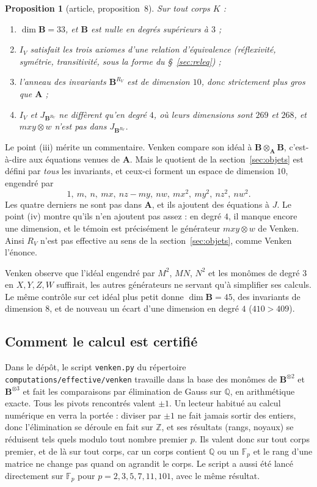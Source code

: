 \documentclass[11pt,a4paper]{amsart}
\theoremstyle{definition}
\theoremstyle{plain}
\newtheorem*{proposition}{Proposition}
\theoremstyle{remark}
\newcommand{\F}{\mathbb F}
\newcommand{\Q}{\mathbb Q}
\newcommand{\Z}{\mathbb Z}
\begin{document}
\begin{proposition}[article, proposition~8]
Sur tout corps $K$ :
\begin{enumerate}
\item $\dim \mathbf B = 33$, et $\mathbf B$ est nulle en degrés supérieurs à $3$ ;
\item $I_V$ satisfait les trois axiomes d'une relation d'équivalence (réflexivité, symétrie, transitivité, sous la forme du §~\ref{sec:releq}) ;
\item l'anneau des invariants $\mathbf B^{R_V}$ est de dimension $10$, donc strictement plus gros que $\mathbf A$ ;
\item $I_V$ et $J_{\mathbf B^{R_V}}$ ne diffèrent qu'en degré $4$, où leurs dimensions sont $269$ et $268$, et $mxy \otimes w$ n'est pas dans $J_{\mathbf B^{R_V}}$.
\end{enumerate}
\end{proposition}

Le point (iii) mérite un commentaire. Venken compare son idéal à $\mathbf B \otimes_{\mathbf A} \mathbf B$, c'est-à-dire aux équations venues de $\mathbf A$. Mais le quotient de la section~\ref{sec:objets} est défini par \emph{tous} les invariants, et ceux-ci forment un espace de dimension $10$, engendré par
\[
1,\ m,\ n,\ mx,\ nz - my,\ nw,\ mx^2,\ my^2,\ nz^2,\ nw^2.
\]
Les quatre derniers ne sont pas dans $\mathbf A$, et ils ajoutent des équations à $J$. Le point (iv) montre qu'ils n'en ajoutent pas assez : en degré $4$, il manque encore une dimension, et le témoin est précisément le générateur $mxy \otimes w$ de Venken. Ainsi $R_V$ n'est pas effective au sens de la section~\ref{sec:objets}, comme Venken l'énonce.

Venken observe que l'idéal engendré par $M^2$, $MN$, $N^2$ et les monômes de degré $3$ en $X, Y, Z, W$ suffirait, les autres générateurs ne servant qu'à simplifier ses calculs. Le même contrôle sur cet idéal plus petit donne $\dim \mathbf B = 45$, des invariants de dimension $8$, et de nouveau un écart d'une dimension en degré $4$ ($410 > 409$).

\subsection{Comment le calcul est certifié}

Dans le dépôt, le script \texttt{venken.py} du répertoire \texttt{computations/\allowbreak effective/\allowbreak venken} travaille dans la base des monômes de $\mathbf B^{\otimes 2}$ et $\mathbf B^{\otimes 3}$ et fait les comparaisons par élimination de Gauss sur $\Q$, en arithmétique exacte. Tous les pivots rencontrés valent $\pm 1$. Un lecteur habitué au calcul numérique en verra la portée : diviser par $\pm 1$ ne fait jamais sortir des entiers, donc l'élimination se déroule en fait sur $\Z$, et ses résultats (rangs, noyaux) se réduisent tels quels modulo tout nombre premier $p$. Ils valent donc sur tout corps premier, et de là sur tout corps, car un corps contient $\Q$ ou un $\F_p$ et le rang d'une matrice ne change pas quand on agrandit le corps. Le script a aussi été lancé directement sur $\F_p$ pour $p = 2, 3, 5, 7, 11, 101$, avec le même résultat.
\end{document}
